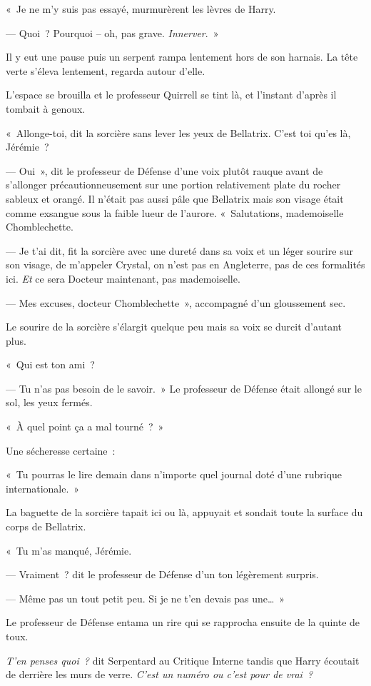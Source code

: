 «~Je ne m'y suis pas essayé, murmurèrent les lèvres de Harry.

--- Quoi~?
Pourquoi -- oh, pas grave.
\emph{Innerver}.~»

Il y eut une pause puis un serpent rampa lentement hors de son harnais.
La tête verte s'éleva lentement, regarda autour d'elle.

L'espace se brouilla et le professeur Quirrell se tint là, et l'instant d'après il tombait à genoux.

«~Allonge-toi, dit la sorcière sans lever les yeux de Bellatrix.
C'est toi qu'es là, Jérémie~?

--- Oui~», dit le professeur de Défense d'une voix plutôt rauque avant de s'allonger précautionneusement sur une portion relativement plate du rocher sableux et orangé.
Il n'était pas aussi pâle que Bellatrix mais son visage était comme exsangue sous la faible lueur de l'aurore.
«~Salutations, mademoiselle Chomblechette.

--- Je t'ai dit, fit la sorcière avec une dureté dans sa voix et un léger sourire sur son visage, de m'appeler Crystal, on n'est pas en Angleterre, pas de ces formalités ici.
\emph{Et} ce sera Docteur maintenant, pas mademoiselle.

--- Mes excuses, docteur Chomblechette~», accompagné d'un gloussement sec.

Le sourire de la sorcière s'élargit quelque peu mais sa voix se durcit d'autant plus.

«~Qui est ton ami~?

--- Tu n'as pas besoin de le savoir.~»
Le professeur de Défense était allongé sur le sol, les yeux fermés.

«~À quel point ça a mal tourné~?~»

Une sécheresse certaine~:

«~Tu pourras le lire demain dans n'importe quel journal doté d'une rubrique internationale.~»

La baguette de la sorcière tapait ici ou là, appuyait et sondait toute la surface du corps de Bellatrix.

«~Tu m'as manqué, Jérémie.

--- Vraiment~? dit le professeur de Défense d'un ton légèrement surpris.

--- Même pas un tout petit peu.
Si je ne t'en devais pas une…~»

Le professeur de Défense entama un rire qui se rapprocha ensuite de la quinte de toux.

\emph{T'en penses quoi~?} dit Serpentard au Critique Interne tandis que Harry écoutait de derrière les murs de verre.
\emph{C'est un numéro ou c'est pour de vrai~?}

